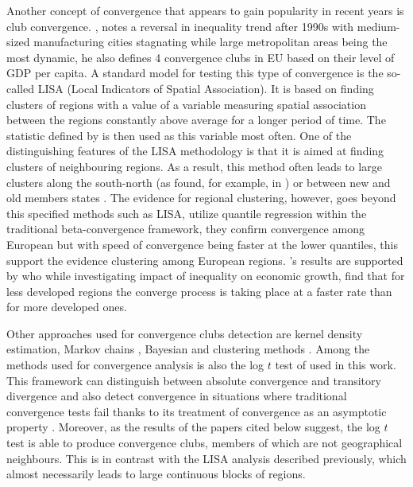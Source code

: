 \documentclass[11pt]{article}
\begin{document}
 Another concept of convergence that appears to gain popularity in recent years is club convergence. \citet{iammarino2017regional}, notes a reversal in inequality trend after 1990s with medium-sized manufacturing cities stagnating while large metropolitan areas being the most dynamic, he also defines 4 convergence clubs in EU based on their level of GDP per capita.  %
 A standard model for testing this type of convergence is the so-called LISA (Local Indicators of Spatial Association). It is based on finding clusters of regions with a value of a variable measuring spatial association between the regions constantly above average for a longer period of time. The statistic defined by \citet{getis1992analysis} is then used as this variable most often. One of the distinguishing features of the LISA methodology is that it is aimed at finding clusters of neighbouring regions. As a result, this method often leads to large clusters along the south-north  (as found, for example, in \citet{baumont2003spatial}) or between new and old members states \citep{eckey2007convergence}. The evidence for regional clustering, however, goes beyond this specified methods such as LISA, \citet{cartone2021does} utilize quantile regression within the traditional  beta-convergence framework, they confirm convergence among European but with speed of convergence being faster at the lower quantiles, this support the evidence clustering among European regions. \citeauthor{cartone2021does}'s results are supported by \citet{panzera2022impact} who while investigating impact of inequality on economic growth, find that for less developed regions the converge process is taking place at a faster rate than for more developed ones.
 
Other approaches used for convergence clubs detection are kernel density estimation, Markov chains \citep{eckey2007convergence}, Bayesian \citep{fischer2015bayesian} and clustering methods \citep{maasoumi2008economic}. 
Among the methods used for convergence analysis is also the log $t$ test of \citet{phillips2007transition} used in this work. This framework can distinguish between absolute convergence and transitory divergence and also detect convergence in situations where traditional convergence tests fail thanks to its treatment of convergence as an asymptotic property \citep{bartkowska2012regional, borsi2015evolution}.
Moreover, as the results of the papers cited below suggest, the log $t$ test is able to produce convergence clubs, members of which are not geographical neighbours. This is in contrast with the LISA analysis described previously, which almost necessarily leads to large continuous blocks of regions.
\end{document}
